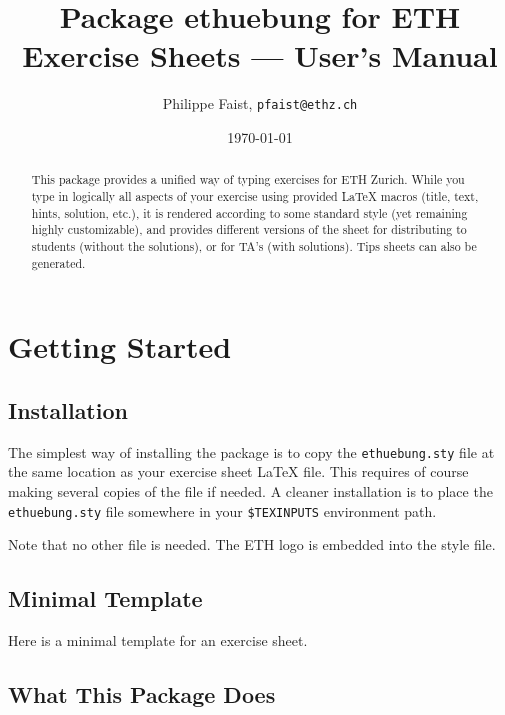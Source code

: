 \documentclass[11pt,a4paper]{article}
\title{Package {\fontseries{m}\selectfont ethuebung} for ETH Exercise Sheets --- User's Manual}
\author{Philippe Faist, \texttt{pfaist{@}ethz.ch}}
\date\today
\begin{document}
\maketitle

\renewcommand{\abstractname}{}
\renewcommand{\noteabstracttextfont}{\small}
\begin{abstract}
This package provides a unified way of typing exercises for ETH Zurich. While you type in
logically all aspects of your exercise using provided \LaTeX{} macros (title, text, hints,
solution, etc.), it is rendered according to some standard style (yet remaining highly
customizable), and provides different versions of the sheet for distributing to students
(without the solutions), or for TA's (with solutions). Tips sheets can also be generated.
\end{abstract}

{\small
\inlinetoc
}

\section{Getting Started}

\subsection{Installation}

The simplest way of installing the \ethuebung{} package is to copy the
\texttt{ethuebung.sty} file at the same location as your exercise sheet \LaTeX{} file. This
requires of course making several copies of the file if needed.
A cleaner installation is to place the \texttt{ethuebung.sty} file somewhere in your
\texttt{\$TEXINPUTS} environment path.

Note that no other file is needed. The ETH logo is embedded into the style file.


\subsection{Minimal Template}
\label{sec:minimaltemplate}

Here is a minimal template for an exercise sheet.

\begin{pkgverbatim}%
%
\end{pkgverbatim}


\subsection{What This Package Does}
\end{document}

